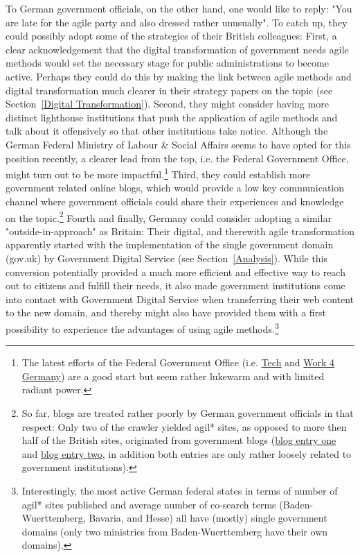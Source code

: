 To German government officials, on the other hand, one would like to reply: "You are late for the agile party and also dressed rather unusually". To catch up, they could possibly adopt some of the strategies of their British colleagues: First, a clear acknowledgement that the digital transformation of government needs agile methods would set the necessary stage for public administrations to become active. Perhaps they could do this by making the link between agile methods and digital transformation much clearer in their strategy papers on the topic (see Section~\ref{Digital Transformation}). Second, they might consider having more distinct lighthouse institutions that push the application of agile methods and talk about it offensively so that other institutions take notice. Although the German Federal Ministry of Labour \& Social Affairs seems to have opted for this position recently, a clearer lead from the top, i.e. the Federal Government Office, might turn out to be more impactful.\footnote{The latest efforts of the Federal Government Office (i.e. \href{https://tech.4germany.org/}{Tech} and \href{https://work.4germany.org/}{Work 4 Germany}) are a good start but seem rather lukewarm and with limited radiant power.} Third, they could establish more government related online blogs, which would provide a low key communication channel where government officials could share their experiences and knowledge on the topic.\footnote{So far, blogs are treated rather poorly by German government officials in that respect: Only two of the crawler yielded agil* sites, as opposed to more then half of the British sites, originated from government blogs (\href{https://mb.sachsen-anhalt.de/start/blog-detailansicht/?cHash=76b9e1e8417e5e36ae5105ad14afa4f2&tx_t3extblog_blogsystem\%5Baction\%5D=show&tx_t3extblog_blogsystem\%5Bday\%5D=23&tx_t3extblog_blogsystem\%5Bmonth\%5D=06&tx_t3extblog_blogsystem\%5Bpost\%5D=267&tx_t3extblog_blogsystem\%5Byear\%5D=2018}{blog entry one} and \href{https://frauenseiten.bremen.de/blog/internationales-sommerstudium-informatica-feminale/}{blog entry two}, in addition both entries are only rather loosely related to government institutions).} Fourth and finally, Germany could consider adopting a similar "outside-in-approach" as Britain: Their digital, and therewith agile transformation apparently started with the implementation of the single government domain (gov.uk) by Government Digital Service (see Section~\ref{Analysis}). While this conversion potentially provided a much more efficient and effective way to reach out to citizens and fulfill their needs, it also made government institutions come into contact with Government Digital Service when transferring their web content to the new domain, and thereby might also have provided them with a first possibility to experience the advantages of using agile methods.\footnote{Interestingly, the most active German federal states in terms of number of agil* sites published and average number of co-search terms (Baden-Wuerttemberg, Bavaria, and Hesse) all have (mostly) single government domains (only two ministries from Baden-Wuerttemberg have their own domains).}

